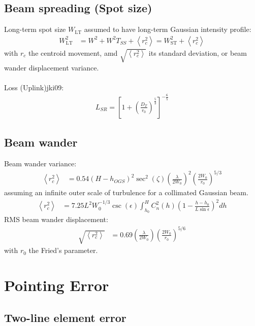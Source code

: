 \documentclass[a4paper]{article}
\begin{document}
\subsection{Beam spreading (Spot size)}
Long-term spot size $W_{\textrm{LT}}$ assumed to have long-term Gaussian intensity profile:
\begin{align*}
W_{\textrm{LT}}^2 &= W^2 + W^2 T_{SS}+\left\langle r_c^2\right\rangle = W_{\textrm{ST}}^2 + \left\langle r_c^2\right\rangle 
\end{align*}
with $r_c$ the centroid movement, amd $\sqrt{\left\langle r_c^2\right\rangle}$ its standard deviation, or beam wander displacement variance.\\
\\
Loss (Uplink)jki09:\\
\begin{align*}
L_{SR} = \left[1+\left(\frac{D_T}{r_0}\right)^{\frac{5}{3}}\right]^{-\frac{6}{5}}
\end{align*}
 
\subsection{Beam wander}
Beam wander variance:
\begin{align*}
\left\langle r_c^2\right \rangle &= 0.54\left(H-h_{OGS}\right)^2\sec^2(\zeta)\left(\frac{\lambda}{2W_0}\right)^2\left(\frac{2W_0}{r_0}\right)^{5/3}
\end{align*}
assuming an infinite outer scale of turbulence for a collimated Gaussian beam.\\
\begin{align*}
\left\langle r_c^2\right\rangle &= 7.25L^2 W_0^{-1/3}\csc(\epsilon)\int^H_{h_0} C^2_n(h)\left(1-\frac{h-h_0}{L\sin\epsilon}\right)^2  dh
\end{align*}
RMS beam wander displacement:
\begin{align*}
\sqrt{\left\langle r_c^2\right\rangle} &= 0.69\left(\frac{\lambda}{2W_0}\right)\left(\frac{2W_0}{r_0}\right)^{5/6}
\end{align*}
with $r_0$ the Fried's parameter.\\

\section{Pointing Error}
\subsection{Two-line element error}
\end{document}
